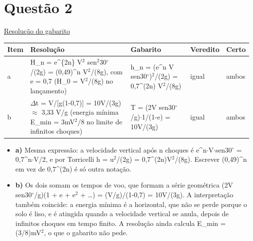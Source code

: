 \documentclass{article}%
\begin{document}
\section*{Questão 2}%
\href{https://poliedroresolve.sistemapoliedro.com.br/vestibulares/ita/2027/ita-2-fase-dia-3-22-10-2026-2-fase-dia-3/dissertativa-2-fisica-2-fase-dia-3-ita-2027}{Resolução do gabarito}\par\smallskip%
\begin{longtable}{@{}p{} p{} p{} p{} p{}@{}}\toprule Item & Resolução & Gabarito & Veredito & Certo \\ \midrule
a & H\_n = e\^{}\{2n\} V$^2$ sen$^2$30$^\circ$/(2g) = (0,49)\^{}n V$^2$/(8g), com e = 0,7 (H\_0 = V$^2$/(8g) no lançamento) & h\_n = (e\^{}n V sen30$^\circ$)$^2$/(2g) = 0,7\^{}(2n) V$^2$/(8g) & igual & ambos \\
b & $\Delta$t = V/{[}g(1-0,7){]} = 10V/(3g) $\approx$ 3,33 V/g (energia mínima E\_min = 3mV$^2$/8 no limite de infinitos choques) & T = (2V sen30$^\circ$/g)$\cdot$1/(1-e) = 10V/(3g) & igual & ambos \\
\bottomrule\end{longtable}%
\begin{itemize}%
\item%
\textbf{a)} Mesma expressão: a velocidade vertical após n choques é e\^{}n$\cdot$V$\cdot$sen30$^\circ$ = 0,7\^{}n$\cdot$V/2, e por Torricelli h = u$^2$/(2g) = 0,7\^{}(2n)V$^2$/(8g). Escrever (0,49)\^{}n em vez de 0,7\^{}(2n) é só outra notação.%
\item%
\textbf{b)} Os dois somam os tempos de voo, que formam a série geométrica (2V sen30$^\circ$/g)(1 + e + e$^2$ + \ldots{}) = (V/g)/(1-0,7) = 10V/(3g). A interpretação também coincide: a energia mínima é a horizontal, que não se perde porque o solo é liso, e é atingida quando a velocidade vertical se anula, depois de infinitos choques em tempo finito. A resolução ainda calcula E\_min = (3/8)mV$^2$, o que o gabarito não pede.%
\end{itemize}%
\end{document}
